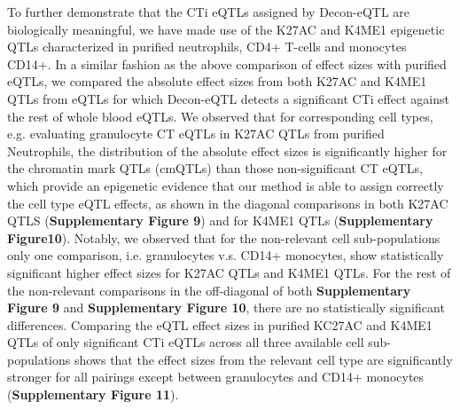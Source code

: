 To further demonstrate that the CTi eQTLs assigned by Decon-eQTL are biologically meaningful, we have made use of the K27AC and K4ME1 epigenetic QTLs characterized in purified neutrophils, CD4+ T-cells and monocytes CD14+\cite{chenGeneticDriversEpigenetic2016}. In a similar fashion as the above comparison of effect sizes with purified eQTLs, we compared the absolute effect sizes from both K27AC and K4ME1 QTLs from eQTLs for which Decon-eQTL detects a significant CTi effect against the rest of whole blood eQTLs. We observed that for corresponding cell types, e.g. evaluating granulocyte CT eQTLs in K27AC QTLs from purified Neutrophils, the distribution of the absolute effect sizes is significantly higher for the chromatin mark QTLs (cmQTLs) than those non-significant CT eQTLs, which provide an epigenetic evidence that  our method is able to assign correctly the cell type eQTL effects, as shown in the diagonal comparisons in both K27AC QTLS (\textbf{Supplementary Figure 9}) and for K4ME1 QTLs (\textbf{Supplementary Figure10}). Notably, we observed that for the non-relevant cell sub-populations only one comparison, i.e. granulocytes v.s. CD14+ monocytes, show statistically significant higher effect sizes for K27AC QTLs and K4ME1 QTLs. For the rest of the non-relevant comparisons in the off-diagonal of both \textbf{Supplementary Figure 9} and \textbf{Supplementary Figure 10}, there are no statistically significant differences. Comparing the eQTL effect sizes in purified KC27AC and K4ME1 QTLs of only significant CTi eQTLs across all three available cell sub-populations shows that the effect sizes from the relevant cell type are  significantly stronger for all pairings except between granulocytes and CD14+ monocytes (\textbf{Supplementary Figure 11}).

